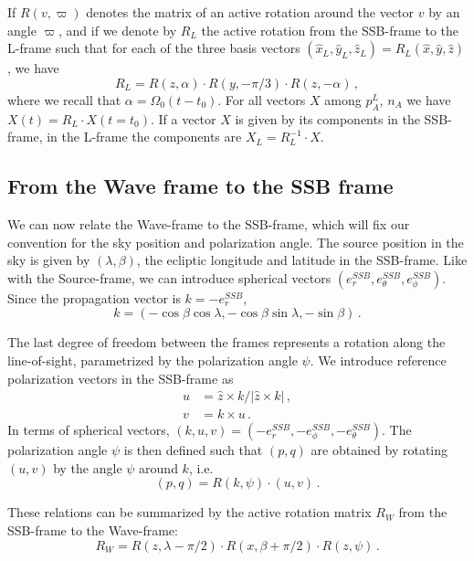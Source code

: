 \documentclass[aps,showpacs,twocolumn,prd,superscriptaddress,nofootinbib]{revtex4-1}
\newcommand{\be}{\begin{equation}}
\newcommand{\ee}{\end{equation}}
\newcommand{\bsub}{\begin{subequations}}
\newcommand{\esub}{\end{subequations}}
\begin{document}
If $R(v,\varpi)$ denotes the matrix of an active rotation around the vector $v$ by an angle $\varpi$, and if we denote by $R_{L}$ the active rotation from the SSB-frame to the L-frame such that for each of the three basis vectors $(\hat{x}_{L}, \hat{y}_{L}, \hat{z}_{L}) = R_{L} (\hat{x}, \hat{y}, \hat{z})$, we have
\be\label{eq:RL}
	R_{L} = R(z, \alpha) \cdot R(y, -\pi/3) \cdot R(z, -\alpha) \,,
\ee
where we recall that $\alpha = \Omega_{0} (t-t_{0}) $. For all vectors $X$ among $p_{A}^{L}$, $n_{A}$ we have $X(t) = R_{L} \cdot X(t=t_{0})$. If a vector $X$ is given by its components in the SSB-frame, in the L-frame the components are $X_{L} = R_{L}^{-1} \cdot X$.


\subsection{From the Wave frame to the SSB frame}
\label{sec:wavessbframe}

We can now relate the Wave-frame to the SSB-frame, which will fix our convention for the sky position and polarization angle. The source position in the sky is given by $(\lambda, \beta)$, the ecliptic longitude and latitude in the SSB-frame. Like with the Source-frame, we can introduce spherical vectors $(e_{r}^{SSB}, e_{\theta}^{SSB}, e_{\phi}^{SSB})$. Since the propagation vector is $k = - e_{r}^{SSB}$,
\be
	k = (- \cos\beta\cos\lambda, - \cos\beta\sin\lambda, -\sin\beta) \,.
\ee

The last degree of freedom between the frames represents a rotation along the line-of-sight, parametrized by the polarization angle $\psi$. We introduce reference polarization vectors in the SSB-frame as
\bsub
\begin{align}
	u &= \hat{z} \times k / |\hat{z} \times k| \,,\\
	v &= k \times u \,.
\end{align}
\esub
In terms of spherical vectors, $(k, u, v) = (-e_{r}^{SSB}, -e_{\phi}^{SSB}, -e_{\theta}^{SSB})$. The polarization angle $\psi$ is then defined such that $(p,q)$ are obtained by rotating $(u,v)$ by the angle $\psi$ around $k$, i.e.
\be
	(p,q) = R(k, \psi) \cdot (u,v) \,.
\ee

These relations can be summarized by the active rotation matrix $R_{W}$ from the SSB-frame to the Wave-frame:
\be\label{eq:RW}
	R_{W} = R(z, \lambda - \pi/2) \cdot R(x, \beta + \pi/2 ) \cdot R(z, \psi)\,.
\ee


\end{document}

